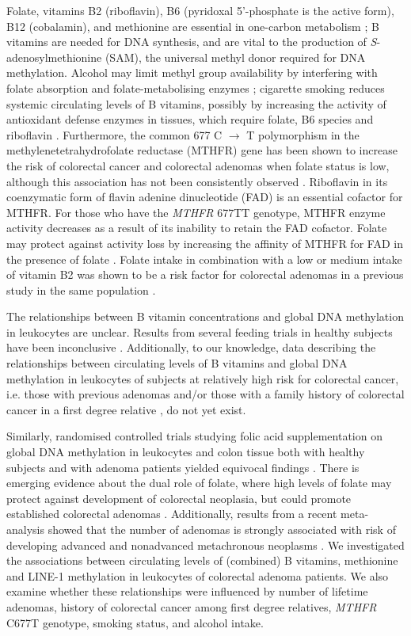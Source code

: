 \noindent Folate, vitamins B2 (riboflavin), B6 (pyridoxal 5'-phosphate is the active form), B12 (cobalamin), and methionine are essential in one-carbon metabolism \cite{c515}; B vitamins are needed for DNA synthesis, and are vital to the production of \emph{S}-adenosylmethionine (SAM), the universal methyl donor required for DNA methylation. Alcohol may limit methyl group availability by interfering with folate absorption and folate-metabolising enzymes \cite{c516}; cigarette smoking reduces systemic circulating levels of B vitamins, possibly by increasing the activity of antioxidant defense enzymes in tissues, which require folate, B6 species and riboflavin \cite{c517}. Furthermore, the common 677 C $\rightarrow$ T polymorphism in the methylenetetrahydrofolate reductase (MTHFR) gene has been shown to increase the risk of colorectal cancer \cite{c518} and colorectal adenomas \cite{c519} when folate status is low, although this association has not been consistently observed \cite{c520,c522}. Riboflavin in its coenzymatic form of flavin adenine dinucleotide (FAD) is an essential cofactor for MTHFR. For those who have the \emph{MTHFR} 677TT genotype, MTHFR enzyme activity decreases as a result of its inability to retain the FAD cofactor. Folate may protect against activity loss by increasing the affinity of MTHFR for FAD in the presence of folate \cite{c523, c524}. Folate intake in combination with a low or medium intake of vitamin B2 was shown to be a risk factor for colorectal adenomas in a previous study in the same population \cite{c525}.

\noindent The relationships between B vitamin concentrations and global DNA methylation in leukocytes are unclear. Results from several feeding trials in healthy subjects have been inconclusive \cite{c526,c529}. Additionally, to our knowledge, data describing the relationships between circulating levels of B vitamins and global DNA methylation in leukocytes of subjects at relatively high risk for colorectal cancer, i.e. those with previous adenomas \cite{c530,c531} and/or those with a family history of colorectal cancer in a first degree relative \cite{c532}, do not yet exist.

\noindent Similarly, randomised controlled trials studying folic acid supplementation on global DNA methylation in leukocytes and colon tissue both with healthy subjects and with adenoma patients yielded equivocal findings \cite{c533,c540}. There is emerging evidence about the dual role of folate, where high levels of folate may protect against development of colorectal neoplasia, but could promote established colorectal adenomas \cite{c541,c542}. Additionally, results from a recent meta-analysis showed that the number of adenomas is strongly associated with risk of developing advanced and nonadvanced metachronous neoplasms \cite{c531}. 
We investigated the associations between circulating levels of (combined) B vitamins, methionine and LINE-1 methylation in leukocytes of colorectal adenoma patients. We also examine whether these relationships were influenced by number of lifetime adenomas, history of colorectal cancer among first degree relatives, \emph{MTHFR} C677T genotype, smoking status, and alcohol intake.

